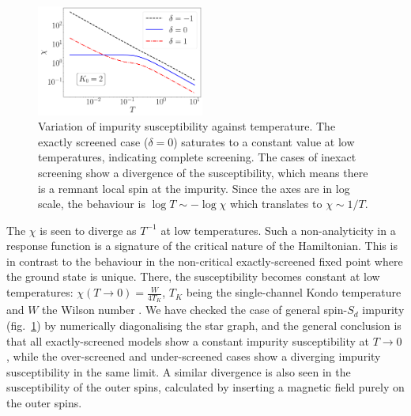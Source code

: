 \documentclass[reprint,prb,superscriptaddress]{revtex4-2}
\begin{document}
\begin{figure}[!htpb]
\centering
\includegraphics[width=0.49\textwidth]{CentralFieldChiPowerlaw.pdf}
\caption{Variation of impurity susceptibility against temperature. The exactly screened case ($\delta=0$) saturates to a constant value at low temperatures, indicating complete screening. The cases of inexact screening show a divergence of the susceptibility, which means there is a remnant local spin at the impurity. Since the axes are in log scale, the behaviour is $\log T \sim -\log \chi$ which translates to $\chi \sim 1/T$.  }
\label{fig:suseptibility_impurity}
\end{figure}

The \(\chi\) is seen to diverge as \(T^{-1}\) at low temperatures.
{\color{red}Such a non-analyticity in a response function is a signature of the critical nature of the Hamiltonian.
This is in contrast to the behaviour in the non-critical exactly-screened fixed point where the ground state is unique.
There, the susceptibility becomes constant at low temperatures: \(\chi(T\to 0) = \frac{W}{4 T_K}\), \(T_K\) being the single-channel Kondo temperature and \(W\) the Wilson number \cite{wilson1975renormalization,nozieres1974fermi,bullaNRGreview,kondo_urg}.}
We have checked the case of general spin-\(S_{d}\) impurity (fig.~\ref{fig:suseptibility_impurity}) by {\color{blue}numerically diagonalising the star graph}, and the general conclusion is that all exactly-screened models show a constant impurity susceptibility at \(T \to 0\), while the over-screened and under-screened cases show a diverging impurity susceptibility in the same limit.
A similar divergence is also seen in the susceptibility of the outer spins, calculated by inserting a magnetic field purely on the outer spins.
\end{document}

